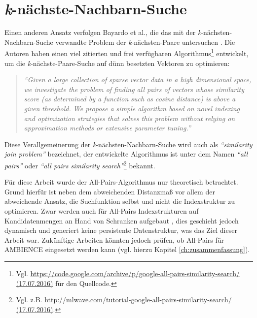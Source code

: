 \section{\textit{k}-nächste-Nachbarn-Suche}\label{sec:bloom-knn}
Einen anderen Ansatz verfolgen Bayardo et al., die das mit der \textit{k}-nächsten-Nachbarn-Suche verwandte Problem der \textit{k}-nächsten-Paare untersuchen \cite{Bayardo2007}. Die Autoren haben einen viel zitierten und frei verfügbaren Algorithmus\footnote{Vgl. \url{https://code.google.com/archive/p/google-all-pairs-similarity-search/ (17.07.2016)} für den Quell\-code.} entwickelt, um die \textit{k}-nächste-Paare-Suche auf dünn besetzten Vektoren zu optimieren: 
\begin{quote}
\textit{"`Given a large collection of sparse vector data in a high dimensional space, we investigate the problem of finding all pairs of vectors whose similarity score (as determined by a function such as cosine distance) is above a given threshold. We propose a simple algorithm based on novel indexing and optimization strategies that solves this problem without relying on approximation methods or extensive parameter tuning."'} \cite{Bayardo2007}
\end{quote}
Diese Verallgemeinerung der \textit{k}-nächsten-Nachbarn-Suche wird auch als \textit{"`similarity join problem"'} \cite{Bayardo2007} bezeichnet, der entwickelte Algorithmus ist unter dem Namen \textit{"`all pairs"'} oder \textit{"`all pairs similarity search"'}\footnote{Vgl. z.B. \url{http://mlwave.com/tutorial-google-all-pairs-similarity-search/ (17.07.2016)}.} bekannt. 

Für diese Arbeit wurde der All-Pairs-Algorithmus nur theoretisch betrachtet. Grund hierfür ist neben dem abweichenden Distanzmaß vor allem der abweichende Ansatz, die Suchfunktion selbst und nicht die Indexstruktur zu optimieren. Zwar werden auch für All-Pairs Indexstrukturen auf Kandidatenmengen an Hand von Schranken aufgebaut \cite{Bayardo2007}, dies geschieht jedoch dynamisch und generiert keine persistente Datenstruktur, was das Ziel dieser Arbeit war. Zukünftige Arbeiten könnten jedoch prüfen, ob All-Pairs für AMBIENCE eingesetzt werden kann (vgl. hierzu Kapitel \ref{ch:zusammenfassung}). 